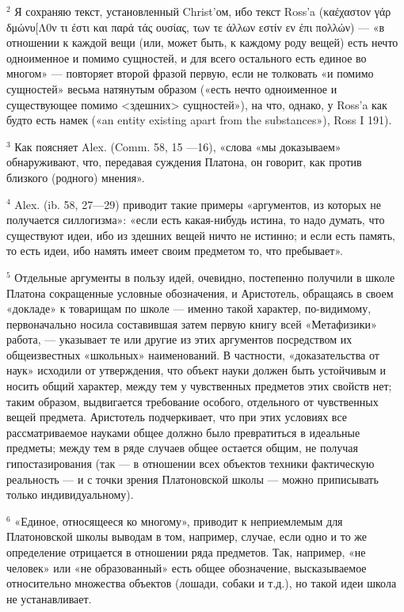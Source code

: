 \documentclass[oneside, 17pt, dvipsnames]{extbook}
\begin{document}
$^2$ Я сохраняю текст, установленный Christ'ом, ибо текст Ross'a (καέχαστον γάρ δμώνυ[Λ0ν τι έστι και παρά τάς ουσίας, των τε άλλων εστίν εν έπι πολλών) — «в отношении к каждой вещи (или, может быть, к каждому роду вещей) есть нечто одноименное и помимо сущностей, и для всего остального есть единое во многом» — повторяет второй фразой первую, если не толковать «и помимо сущностей» весьма натянутым образом («есть нечто одноименное и существующее помимо <здешних> сущностей»), на что, однако, у Ross'a как будто есть намек («an entity existing apart from the substances»), Ross I 191).

$^3$ Как поясняет Alex. (Comm. 58, 15 —16), «слова «мы доказываем» обнаруживают, что, передавая суждения Платона, он говорит, как против близкого (родного) мнения».

$^4$ Alex. (ib. 58, 27—29) приводит такие примеры «аргументов, из которых не получается силлогизма»: «если есть какая-нибудь истина, то надо думать, что существуют идеи, ибо из здешних вещей ничто не истинно; и если есть память, то есть идеи, ибо намять имеет своим предметом то, что пребывает».

$^5$ Отдельные аргументы в пользу идей, очевидно, постепенно получили в школе Платона сокращенные условные обозначения, и Аристотель, обращаясь в своем «докладе» к товарищам по школе — именно такой характер, по-видимому, первоначально носила составившая затем первую книгу всей «Метафизики» работа, — указывает те или другие из этих аргументов посредством их общеизвестных «школьных» наименований. В частности, «доказательства от наук» исходили от утверждения, что объект науки должен быть устойчивым и носить общий характер, между тем у чувственных предметов этих свойств нет; таким образом, выдвигается требование особого, отдельного от чувственных вещей предмета. Аристотель подчеркивает, что при этих условиях все рассматриваемое науками общее должно было превратиться в идеальные предметы; между тем в ряде случаев общее остается общим, не получая гипостазирования (так — в отношении всех объектов техники фактическую реальность — и с точки зрения Платоновской школы — можно приписывать только индивидуальному).

$^6$ «Единое, относящееся ко многому», приводит к неприемлемым для Платоновской школы выводам в том, например, случае, если одно и то же определение отрицается в отношении ряда предметов. Так, например, «не человек» или «не образованный» есть общее обозначение, высказываемое относительно множества объектов (лошади, собаки и т.д.), но такой идеи школа не устанавливает.
\end{document}
